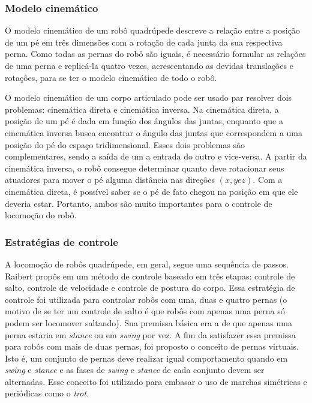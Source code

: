 \documentclass[../main.tex]{subfiles}
\begin{document}
  \subsubsection{Modelo cinemático}
  O modelo cinemático de um robô quadrúpede descreve a relação entre a posição de um pé em três dimensões com a rotação de cada junta da sua respectiva perna. Como todas as pernas do robô são iguais, é necessário formular as relações de uma perna e replicá-la quatro vezes, acrescentando as devidas translações e rotações, para se ter o modelo cinemático de todo o robô. 
  
  O modelo cinemático de um corpo articulado pode ser usado par resolver dois problemas: cinemática direta e cinemática inversa. Na cinemática direta, a posição de um pé é dada em função dos ângulos das juntas, enquanto que a cinemática inversa busca encontrar o ângulo das juntas que correspondem a uma posição do pé do espaço tridimensional. Esses dois problemas são complementares, sendo a saída de um a entrada do outro e vice-versa. A partir da cinemática inversa, o robô consegue determinar quanto deve rotacionar seus atuadores para mover o pé alguma distância nas direções $(x, y e z)$. Com a cinemática direta, é possível saber se o pé de fato chegou na posição em que ele deveria estar. Portanto, ambos são muito importantes para o controle de locomoção do robô.

  \subsubsection{Estratégias de controle}
  A locomoção de robôs quadrúpede, em geral, segue uma sequência de passos. Raibert propôs em \cite{Raibert1986} um método de controle baseado em três etapas: controle de salto, controle de velocidade e controle de postura do corpo. Essa estratégia de controle foi utilizada para controlar robôs com uma, duas e quatro pernas (o motivo de se ter um controle de salto é que robôs com apenas uma perna só podem ser locomover saltando). Sua premissa básica era a de que apenas uma perna estaria em \textit{stance} ou em \textit{swing} por vez. A fim da satisfazer essa premissa para robôs com mais de duas pernas, foi proposto o conceito de pernas virtuais. Isto é, um conjunto de pernas deve realizar igual comportamento quando em \textit{swing} e \textit{stance} e as fases de \textit{swing} e \textit{stance} de cada conjunto devem ser alternadas. Esse conceito foi utilizado para embasar o uso de marchas simétricas e periódicas como o \textit{trot}.
\end{document}
